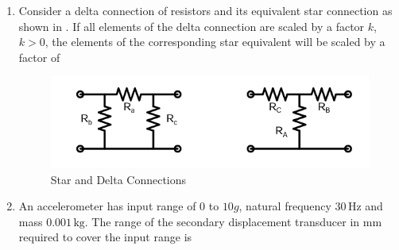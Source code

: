 \documentclass[journal,12pt,onecolumn]{IEEEtran}
\theoremstyle{remark}
\begin{document}
\begin{enumerate}
\item Consider a delta connection of resistors and its equivalent star connection as shown in . If all elements of the delta connection are scaled by a factor $k$, $k > 0$, the elements of the corresponding star equivalent will be scaled by a factor of 
\par \hfill{}
\begin{figure}[H]
    \centering
    \includegraphics[width=0.5\columnwidth]{Figs/Q-21.png}
    \caption{Star and Delta Connections}
    \label{21}
\end{figure}
\begin{enumerate}
\end{enumerate}

\item An accelerometer has input range of $0$ to $10g$, natural frequency $30 \,\text{Hz}$ and mass $0.001\,\text{kg}$. The range of the secondary displacement transducer in mm required to cover the input range is  
\par \hfill{}
\begin{enumerate}
\end{enumerate}


\end{enumerate}
\end{document}
